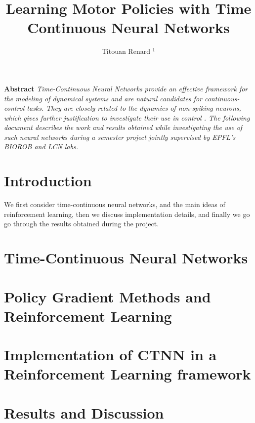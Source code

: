 \documentclass{two-col-epfl}
\begin{document}

\title{Learning Motor Policies with Time Continuous Neural Networks}

\author{Titouan Renard $^1$}

\address{}
\maketitle








\textbf{Abstract}
\textit{Time-Continuous Neural Networks provide an effective framework for the modeling of dynamical systems \cite{Chen2018NeuralOD} and are natural candidates for continuous-control tasks. They are closely related to the dynamics of non-spiking neurons, which gives further justification to investigate their use in control \cite{Lechner2020NeuralCP}. The following document describes the work and results obtained while investigating the use of such neural networks during a semester project jointly supervised by EPFL's BIOROB and LCN labs.}

\section*{Introduction}

We first consider time-continuous neural networks, and the main ideas of reinforcement learning, then we discuss implementation details, and finally we go go through the results obtained during the project.

\section{Time-Continuous Neural Networks}


\section{Policy Gradient Methods and Reinforcement Learning}


\section{Implementation of CTNN in a Reinforcement Learning framework}


\section{Results and Discussion}



\printbibliography
\end{document}
